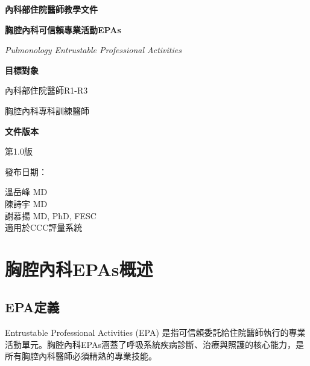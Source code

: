 \documentclass[12pt,a4paper]{article}
\newcommand{\mydate}{\DTMtoday}
\begin{document}
\begin{titlepage}
    \centering
    {\LARGE\textcolor{emergency_red}{\textbf{內科部住院醫師教學文件}}\par}
    \vspace{1cm}
    {\huge\bfseries 胸腔內科可信賴專業活動EPAs\par}
    \vspace{0.5cm}
    {\Large\textcolor{emergency_blue}{\textit{Pulmonology Entrustable Professional Activities}}\par}
    \vspace{1cm}
    
    \begin{tcolorbox}[
        colback=emergency_blue!5!white,
        colframe=emergency_blue,
        width=0.8\textwidth,
        arc=10pt,
        boxrule=1pt
    ]
    \centering
    {\large\textbf{目標對象}\par}
    \vspace{0.3cm}
    內科部住院醫師R1-R3\par
    胸腔內科專科訓練醫師\par
    \vspace{0.5cm}
    {\large\textbf{文件版本}\par}
    \vspace{0.3cm}
    第1.0版\par
    發布日期：\mydate\par
    \end{tcolorbox}

    \vfill
    
    {\large 溫岳峰 MD\\陳詩宇 MD \\謝慕揚 MD, PhD, FESC\\
    適用於CCC評量系統\par}
    
    \vspace{0.5cm}
\end{titlepage}

\newpage
\tableofcontents
\newpage

\section{胸腔內科EPAs概述}

\subsection{EPA定義}
Entrustable Professional Activities (EPA) 是指可信賴委託給住院醫師執行的專業活動單元。胸腔內科EPAs涵蓋了呼吸系統疾病診斷、治療與照護的核心能力，是所有胸腔內科醫師必須精熟的專業技能。
\end{document}
